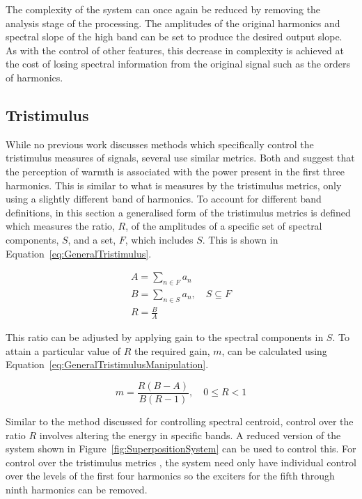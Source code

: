 		The complexity of the system can once again be reduced by removing the analysis stage of the processing.
		The amplitudes of the original harmonics and spectral slope of the high band can be set to produce the
		desired output slope. As with the control of other features, this decrease in complexity is achieved at the
		cost of losing spectral information from the original signal such as the orders of harmonics.

	\subsection{Tristimulus}
	\label{sec:FeatureControl-Parameterisation-Tristimulus}
		While no previous work discusses methods which specifically control the tristimulus measures of signals,
		several use similar metrics. Both \cite{williams2010perceptually} and \cite{zacharakis2011an} suggest that
		the perception of warmth is associated with the power present in the first three harmonics. This is similar
		to what is measures by the tristimulus metrics, only using a slightly different band of harmonics. To
		account for different band definitions, in this section a generalised form of the tristimulus metrics is
		defined which measures the ratio, $R$, of the amplitudes of a specific set of spectral components, $S$, and
		a set, $F$, which includes $S$. This is shown in Equation~\ref{eq:GeneralTristimulus}.

		\begin{gather}
			A = \sum_{n \in F} a_{n} \nonumber \\
			B = \sum_{n \in S} a_{n}, \quad S \subseteq F \nonumber \\
			R = \frac{B}{A}
			\label{eq:GeneralTristimulus}
		\end{gather}

		This ratio can be adjusted by applying gain to the spectral components in $S$. To attain a particular value
		of $R$ the required gain, $m$, can be calculated using Equation~\ref{eq:GeneralTristimulusManipulation}.

		\begin{equation}
			m = \frac{R(B - A)}{B(R - 1)}, \quad 0 \leq R < 1
			\label{eq:GeneralTristimulusManipulation}
		\end{equation}

		Similar to the method discussed for controlling spectral centroid, control over the ratio $R$ involves
		altering the energy in specific bands. A reduced version of the system shown in
		Figure~\ref{fig:SuperpositionSystem} can be used to control this. For control over the tristimulus metrics
		, the system need only have individual control over the levels of the first four harmonics so the exciters
		for the fifth through ninth harmonics can be removed.

